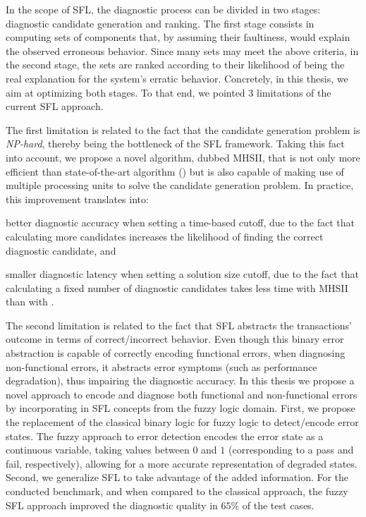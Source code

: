 In the scope of \ac{SFL}, the diagnostic process can be divided in two
stages: diagnostic candidate generation and ranking.
%
The first stage consists in computing sets of components that, by
assuming their faultiness, would explain the observed erroneous
behavior.
%
Since many sets may meet the above criteria, in the second stage, the
sets are ranked according to their likelihood of being the real
explanation for the system's erratic behavior.
%
Concretely, in this thesis, we aim at optimizing both stages.
%
To that end, we pointed $3$ limitations of the current \ac{SFL}
approach.



The first limitation is related to the fact that the candidate
generation problem is \emph{NP-hard}, thereby being the bottleneck of
the \ac{SFL} framework.
%
Taking this fact into account, we propose a novel algorithm, dubbed
\acs{MHSII}, that is not only more efficient than state-of-the-art
algorithm (\staccato{}) but is also capable of making use of multiple
processing units to solve the candidate generation problem.
%
In practice, this improvement translates into:
\begin{inparaenum}[(1)]
\item better diagnostic accuracy when setting a time-based cutoff, due
  to the fact that calculating more candidates increases the
  likelihood of finding the correct diagnostic candidate, and
\item smaller diagnostic latency when setting a solution size cutoff,
  due to the fact that calculating a fixed number of diagnostic
  candidates takes less time with \acs{MHSII} than with \staccato{}.
\end{inparaenum}



The second limitation is related to the fact that \ac{SFL} abstracts
the transactions' outcome in terms of correct/incorrect behavior.
%
Even though this binary error abstraction is capable of correctly
encoding functional errors, when diagnosing non-functional errors, it
abstracts error symptoms (such as performance degradation), thus
impairing the diagnostic accuracy.
%
In this thesis we propose a novel approach to encode and diagnose both
functional and non-functional errors by incorporating in \ac{SFL}
concepts from the fuzzy logic domain.
%
First, we propose the replacement of the classical binary logic for
fuzzy logic to detect/encode error states.
%
The fuzzy approach to error detection encodes the error state as a
continuous variable, taking values between $0$ and $1$ (corresponding
to a pass and fail, respectively), allowing for a more accurate
representation of degraded states.
%
Second, we generalize \ac{SFL} to take advantage of the added
information.
%
For the conducted benchmark, and when compared to the classical
approach, the fuzzy \ac{SFL} approach improved the diagnostic quality
in $65\%$ of the test cases.



